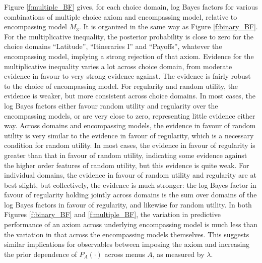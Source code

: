 \documentclass[11pt,letter]{article}
\newcommand{\menus}{menus}
\begin{document}
Figure \ref{f:multiple_BF} gives, for each choice domain, log Bayes factors for various combinations of multiple choice axiom and encompassing model, relative to encompassing model $M_3$.
It is organized in the same way as Figure \ref{f:binary_BF}.
For the multiplicative inequality, the posterior probability is close to zero for the choice domains ``Latitude'', ``Itineraries I'' and ``Payoffs'', whatever the encompassing model, implying a strong rejection of that axiom.
Evidence for the multiplicative inequality varies a lot across choice domain, from moderate evidence in favour to very strong evidence against.
The evidence is fairly robust to the choice of encompassing model.
For regularity and random utility, the evidence is weaker, but more consistent across choice domains.
In most cases, the log Bayes factors either favour random utility and regularity over the encompassing models, or are very close to zero, representing little evidence either way.
Across domains and encompassing models, the evidence in favour of random utility is very similar to the evidence in favour of regularity, which is a necessary condition for random utility.
In most cases, the evidence in favour of regularity is greater than that in favour of random utility, indicating some evidence against the higher order features of random utility, but this evidence is quite weak.
For individual domains, the evidence in favour of random utility and regularity are at best slight, but collectively, the evidence is much stronger: the log Bayes factor in favour of regularity holding jointly across domains is the sum over domains of the log Bayes factors in favour of regularity, and likewise for random utility.
In both Figures \ref{f:binary_BF} and \ref{f:multiple_BF}, the variation in predictive performance of an axiom across underlying encompassing model is much less than the variation in that across the encompassing models themselves.
This suggests similar implications for observables between imposing the axiom and increasing the prior dependence of $P_A(\cdot)$ across \menus{} $A$, as measured by $\lambda$.
\end{document}
